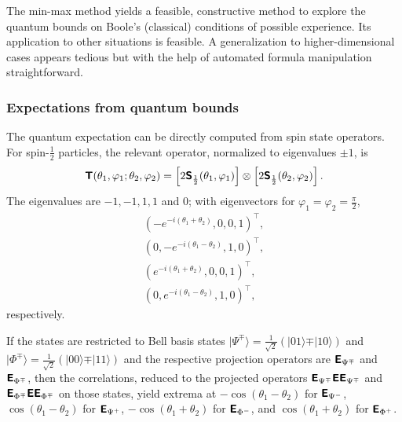 The min-max method yields a feasible, constructive method to explore the quantum bounds on
Boole's (classical) conditions of possible experience.
Its application to other situations is feasible.
A generalization to higher-dimensional cases appears tedious but with the help of automated
formula manipulation straightforward.


\subsubsection{Expectations from quantum bounds}

The quantum expectation can be directly computed from spin state operators.
For spin-$\frac{1}{2}$ particles, the relevant operator, normalized to eigenvalues  $\pm 1$, is
\begin{equation}
\begin{split}
\textsf{\textbf{T}} (\theta_1 ,\varphi_1;\theta_2 ,\varphi_2)
=
\left[2 \textsf{\textbf{S}}_\frac{1}{2} (\theta_1 ,\varphi_1)\right]
\otimes
\left[2 \textsf{\textbf{S}}_\frac{1}{2} (\theta_2 ,\varphi_2)\right]
.
\end{split}
\label{e-2017-b-whatever-e6a}
\end{equation}
The eigenvalues are $-1,-1,1,1$ and $0$; with eigenvectors for   $\varphi_1=\varphi_2=\frac{\pi}{2}$,
\begin{equation}
\begin{split}
\left( -e^{-i (\theta_1+\theta_2)},0,0,1\right)^\intercal  ,  \\
\left( 0,-e^{-i (\theta_1-\theta_2)},1,0\right)^\intercal  ,  \\
\left( e^{-i (\theta_1+\theta_2)},0,0,1\right)^\intercal   ,  \\
\left( 0,e^{-i (\theta_1-\theta_2)},1,0 \right)^\intercal  ,
\end{split}
\label{e-2017-b-whatever-e6b}
\end{equation}
respectively.

If the states are restricted to Bell basis states
$
\vert \Psi^\mp \rangle = \frac{1}{\sqrt{2}}\left(\vert 0   1 \rangle \mp \vert 1   0 \rangle  \right)
$
and
$\vert \Phi^\mp \rangle = \frac{1}{\sqrt{2}}\left(\vert 0   0 \rangle \mp \vert 1   1 \rangle  \right)
$
and the respective projection operators are
$\textsf{\textbf{E}}_{\Psi^\mp}$ and
$\textsf{\textbf{E}}_{\Phi^\mp}$,
then the correlations, reduced to the projected operators
$\textsf{\textbf{E}}_{\Psi^\mp} \textsf{\textbf{E}} \textsf{\textbf{E}}_{\Psi^\mp} $ and
$\textsf{\textbf{E}}_{\Phi^\mp} \textsf{\textbf{E}} \textsf{\textbf{E}}_{\Phi^\mp} $
on those states,
yield extrema at
$-\cos (\theta_1-\theta_2)$ for $\textsf{\textbf{E}}_{\Psi^-}$,
$\cos (\theta_1-\theta_2)$ for $\textsf{\textbf{E}}_{\Psi^+}$,
$-\cos (\theta_1+\theta_2)$ for $\textsf{\textbf{E}}_{\Phi^-}$, and
$\cos (\theta_1+\theta_2)$ for $\textsf{\textbf{E}}_{\Phi^+}$.


